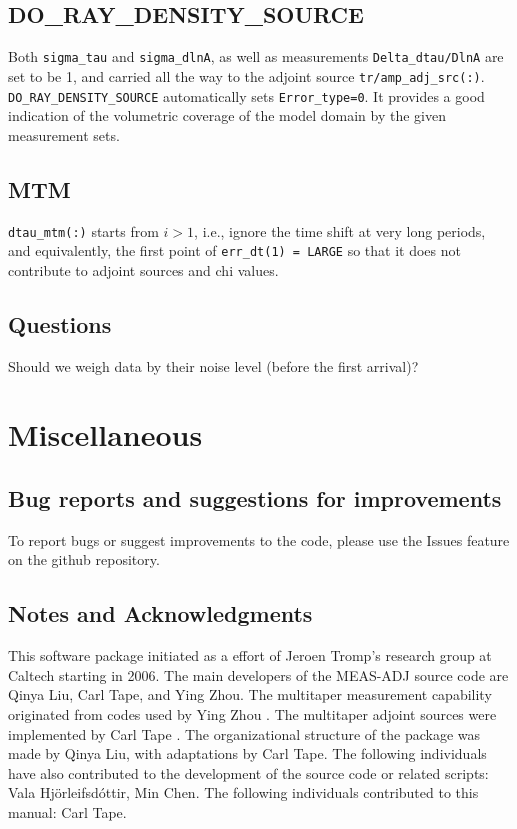 \documentclass[11pt,titlepage,fleqn]{article}
\newcommand{\vala}{Hj\"{o}rleifsd\'{o}ttir}
\begin{document}
\subsection{DO\_RAY\_DENSITY\_SOURCE}
Both \verb+sigma_tau+ and \verb+sigma_dlnA+, as well as measurements \verb+Delta_dtau/DlnA+ are set to be 1,
and carried all the way to the adjoint source \verb+tr/amp_adj_src(:)+. \verb+DO_RAY_DENSITY_SOURCE+ automatically
sets \verb+Error_type=0+. It provides a good indication of the volumetric coverage of the model domain by the
given measurement sets.

\subsection{MTM}
\verb+dtau_mtm(:)+ starts from $i > 1$, i.e., ignore the time shift at very long periods, and equivalently,
the first point of \verb+err_dt(1) = LARGE+ so that it does not contribute to adjoint sources and chi values.

\subsection{Questions}
Should we weigh data by their noise level (before the first arrival)?

\pagebreak
\section{Miscellaneous}

\subsection{Bug reports and suggestions for improvements}

To report bugs or suggest improvements to the code, please use the Issues feature on the github repository.


\subsection{Notes and Acknowledgments}

This software package initiated as a effort of Jeroen Tromp's research group at Caltech starting in 2006.
The main developers of the MEAS-ADJ source code are Qinya Liu, Carl Tape, and Ying Zhou.
The multitaper measurement capability originated from codes used by Ying Zhou \citep[][]{YZhou2004,YZhou2005}.
The multitaper adjoint sources were implemented by Carl Tape \citep[][Appendix~C]{Tape2009phd}.
The organizational structure of the package was made by Qinya Liu, with adaptations by Carl Tape.
The following individuals have also contributed to the development of the source code or related scripts: Vala \vala, Min Chen.
The following individuals contributed to this manual: Carl Tape.
\end{document}

